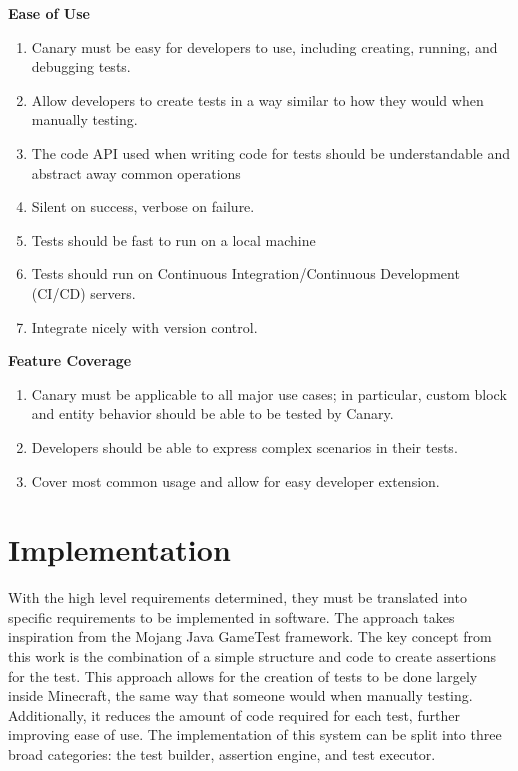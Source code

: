 \documentclass[12pt]{article}
\begin{document}
\begin{onehalfspacing}
\noindent\textbf{Ease of Use}

\begin{enumerate}
\item
  Canary must be easy for developers to use, including creating,
  running, and debugging tests.
\item
  Allow developers to create tests in a way similar to how they would
  when manually testing.
\item
  The code API used when writing code for tests should be understandable
  and abstract away common operations
\item
  Silent on success, verbose on failure.
\item
  Tests should be fast to run on a local machine
\item
  Tests should run on Continuous Integration/Continuous Development
  (CI/CD) servers.
\item
  Integrate nicely with version control.
\end{enumerate}

\noindent\textbf{Feature Coverage}

\begin{enumerate}
\item
  Canary must be applicable to all major use cases; in particular,
  custom block and entity behavior should be able to be tested by
  Canary.
\item
  Developers should be able to express complex scenarios in their tests.
\item
  Cover most common usage and allow for easy developer extension.
\end{enumerate}

\newpage
\section{Implementation}

With the high level requirements determined, they must be translated
into specific requirements to be implemented in software. The approach
takes inspiration from the Mojang Java GameTest framework. The key
concept from this work is the combination of a simple structure and code
to create assertions for the test. This approach allows for the creation
of tests to be done largely inside Minecraft, the same way that someone
would when manually testing. Additionally, it reduces the amount of code
required for each test, further improving ease of use. The
implementation of this system can be split into three broad categories:
the test builder, assertion engine, and test executor.


\end{onehalfspacing}
\end{document}
